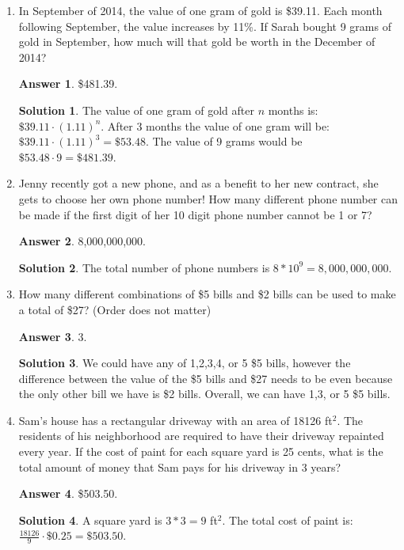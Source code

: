\documentclass[11pt]{article}
\theoremstyle{definition}
\newtheorem*{solution}{Solution}
\newtheorem*{answer}{Answer}
\begin{document}
\begin{enumerate}
\item In September of 2014, the value of one gram of gold is \$39.11.  Each month following September, the value increases by 11\%.  If Sarah bought 9 grams of gold in September, how much will that gold be worth in the December of 2014?
\begin{answer}
\$481.39.
\end{answer}
\begin{solution}
The value of one gram of gold after $n$ months is: $\$39.11\cdot (1.11)^n$.  After 3 months the value of one gram will be: $\$39.11 \cdot (1.11)^3 = \$53.48$. The value of 9 grams would be $\$53.48\cdot 9=\$481.39$.
\end{solution}

\item Jenny recently got a new phone, and as a benefit to her new contract, she gets to choose her own phone number! How many different phone number can be made if the first digit of her 10 digit phone number cannot be 1 or 7?
\begin{answer}
8,000,000,000.
\end{answer}
\begin{solution}
The total number of phone numbers is $8*10^9 = 8,000,000,000$.
\end{solution}

\item How many different combinations of \$5 bills and \$2 bills can be used to make a total of \$27? (Order does not matter)
\begin{answer}
3.
\end{answer}
\begin{solution}
We could have any of 1,2,3,4, or 5 \$5 bills, however the difference between the value of the \$5 bills and \$27 needs to be even because the only other bill we have is \$2 bills. Overall, we can have 1,3, or 5 \$5 bills.
\end{solution}

\item Sam’s house has a rectangular driveway with an area of 18126 ft$^2$.  The residents of his neighborhood are required to have their driveway repainted every year.  If the cost of paint for each square yard is 25 cents, what is the total amount of money that Sam pays for his driveway in 3 years?
\begin{answer}
\$503.50.
\end{answer}
\begin{solution}
A square yard is $3*3=9$ ft$^2$. The total cost of paint is: $\frac{18126}{9} \cdot \$0.25 = \$503.50$.
\end{solution}


\end{enumerate}
\end{document}
